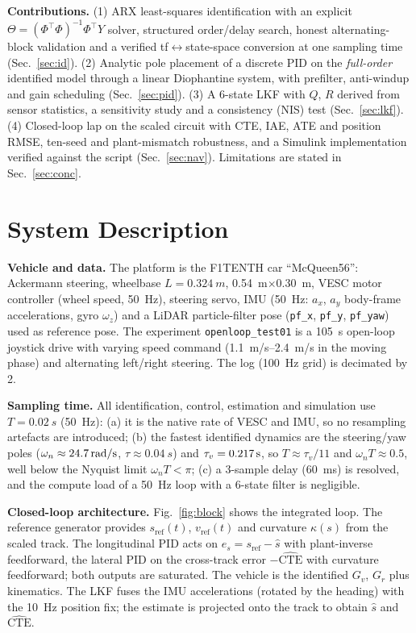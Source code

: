 \documentclass[conference]{IEEEtran}
\begin{document}
\textbf{Contributions.} (1) ARX least-squares identification with an explicit $\Theta=(\Phi^\top\Phi)^{-1}\Phi^\top Y$ solver, structured order/delay search, honest alternating-block validation and a verified tf$\leftrightarrow$state-space conversion at one sampling time (Sec.~\ref{sec:id}). (2) Analytic pole placement of a discrete PID on the \emph{full-order} identified model through a linear Diophantine system, with prefilter, anti-windup and gain scheduling (Sec.~\ref{sec:pid}). (3) A 6-state LKF with $Q$, $R$ derived from sensor statistics, a sensitivity study and a consistency (NIS) test (Sec.~\ref{sec:lkf}). (4) Closed-loop lap on the scaled circuit with CTE, IAE, ATE and position RMSE, ten-seed and plant-mismatch robustness, and a Simulink implementation verified against the script (Sec.~\ref{sec:nav}). Limitations are stated in Sec.~\ref{sec:conc}.

\section{System Description}\label{sec:sys}
\textbf{Vehicle and data.} The platform is the F1TENTH car ``McQueen56'': Ackermann steering, wheelbase $L=\SI{0.324}{m}$, \SI{0.54}{m}$\times$\SI{0.30}{m}, VESC motor controller (wheel speed, \SI{50}{Hz}), steering servo, IMU (\SI{50}{Hz}: $a_x$, $a_y$ body-frame accelerations, gyro $\omega_z$) and a LiDAR particle-filter pose (\texttt{pf\_x}, \texttt{pf\_y}, \texttt{pf\_yaw}) used as reference pose. The experiment \texttt{openloop\_test01} is a \SI{105}{s} open-loop joystick drive with varying speed command (\SIrange{1.1}{2.4}{m/s} in the moving phase) and alternating left/right steering. The log (\SI{100}{Hz} grid) is decimated by 2.

\textbf{Sampling time.} All identification, control, estimation and simulation use $T=\SI{0.02}{s}$ (\SI{50}{Hz}): (a) it is the native rate of VESC and IMU, so no resampling artefacts are introduced; (b) the fastest identified dynamics are the steering/yaw poles ($\omega_n\approx\SI{24.7}{rad/s}$, $\tau\approx\SI{0.04}{s}$) and $\tau_v=\SI{0.217}{s}$, so $T\approx\tau_v/11$ and $\omega_nT\approx0.5$, well below the Nyquist limit $\omega_nT<\pi$; (c) a 3-sample delay (\SI{60}{ms}) is resolved, and the compute load of a \SI{50}{Hz} loop with a 6-state filter is negligible.

\textbf{Closed-loop architecture.} Fig.~\ref{fig:block} shows the integrated loop. The reference generator provides $s_\mathrm{ref}(t)$, $v_\mathrm{ref}(t)$ and curvature $\kappa(s)$ from the scaled track. The longitudinal PID acts on $e_s=s_\mathrm{ref}-\hat s$ with plant-inverse feedforward, the lateral PID on the cross-track error $-\widehat{\mathrm{CTE}}$ with curvature feedforward; both outputs are saturated. The vehicle is the identified $G_v$, $G_r$ plus kinematics. The LKF fuses the IMU accelerations (rotated by the heading) with the \SI{10}{Hz} position fix; the estimate is projected onto the track to obtain $\hat s$ and $\widehat{\mathrm{CTE}}$.
\end{document}
